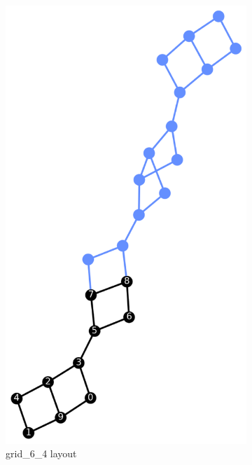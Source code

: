 \begin{figure}[!htb]
    \hfill
    \begin{subfigure}{0.3\linewidth}
        \includegraphics[width=\linewidth]{image/dj_10_grid_6_4.png}
        \caption{grid\_6\_4 layout}
        \label{fig:dj_10_grid_6_4}
    \end{subfigure}
    \hfill
    \begin{subfigure}{0.3\linewidth}

\end{subfigure}
\end{figure}
